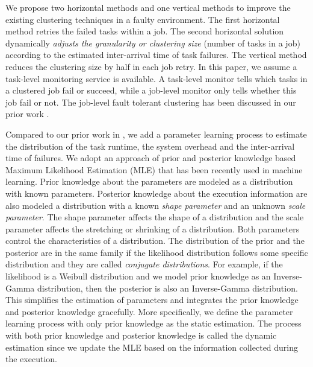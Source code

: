 \documentclass{IOS-Book-Article}
\begin{document}
We propose two horizontal methods and one vertical methods to improve the existing clustering techniques in a faulty environment. The first horizontal method retries the failed tasks within a job. The second horizontal solution dynamically \emph{adjusts the granularity or clustering size} (number of tasks in a job) according to the estimated inter-arrival time of task failures. The vertical method reduces the clustering size by half in each job retry. 
In this paper, we assume a task-level monitoring service is available. A task-level monitor tells which tasks in a clustered job fail or succeed, while a job-level monitor only tells whether this job fail or not. The job-level fault tolerant clustering has been discussed in our prior work \cite{Chen2012}. 



Compared to our prior work in \cite{Chen2012}, we add a parameter learning process to estimate the distribution of the task runtime, the system overhead and the inter-arrival time of failures. We adopt an approach of prior and posterior knowledge based Maximum Likelihood Estimation (MLE) that has been recently used in machine learning. Prior knowledge about the parameters are modeled as a distribution with known parameters. Posterior knowledge about the execution information are also modeled a distribution with a known \emph{shape parameter} and an unknown \emph{scale parameter}. The shape parameter affects the shape of a distribution and the scale parameter affects the stretching or shrinking of a distribution. Both parameters control the characteristics of a distribution. The distribution of the prior and the posterior are in the same family if the likelihood distribution follows some specific distribution and they are called \emph{conjugate distributions}. For example, if the likelihood is a Weibull distribution and we model prior knowledge as an Inverse-Gamma distribution, then the posterior is also an Inverse-Gamma distribution. This simplifies the estimation of parameters and integrates the prior knowledge and posterior knowledge gracefully. More specifically, we define the parameter learning process with only prior knowledge as the static estimation. The process with both prior knowledge and posterior knowledge is called the dynamic estimation since we update the MLE based on the information collected during the execution.  
\end{document}
